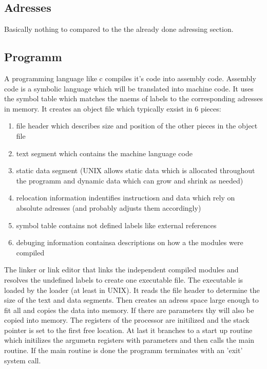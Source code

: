 \documentclass[a4paper]{scrartcl}
\begin{document}
        \subsection{Adresses}
            Basically nothing to compared to the the already done adressing section.
        \subsection{Programm}
            A programming language like c compiles it's code into assembly code. Assembly code is a symbolic language which will be translated into machine code. It uses the 
            symbol table which matches the naems of labels to the corresponding adresses in memory. It creates an object file which typically exsist in 6 pieces:
            \begin{enumerate}
                \item file header which describes size and position of the other pieces in the object file
                \item text segment which contains the machine language code 
                \item static data segment (UNIX allows static data which is allocated throughout the programm and dynamic data which can grow and shrink as needed)
                \item relocation information indentifies instructiosn and data which rely on absolute adresses (and probably adjusts them accordingly)
                \item symbol table contains not defined labels like external references
                \item debuging information containsa descriptions on how a the modules were compiled 
            \end{enumerate}
            The linker or link editor that links the independent compiled modules and resolves the undefined labels to create one executable file. The executable is loaded 
            by the loader (at least in UNIX). It reads the file header to determine the size of the text and data segments. Then creates an adress space large enough to fit all and
            copies the data into memory. If there are parameters thy will also be copied into memory. The registers of the processor are initilized and the stack pointer is set to the
            first free location. At last it branches to a start up routine which initilizes the argumetn registers with parameters and then calls the main routine. If the main routine is done
            the programm terminates with an 'exit' system call.
\end{document}
